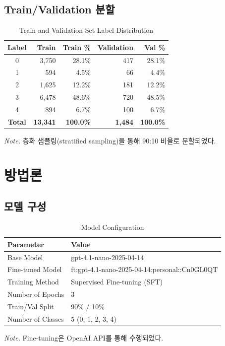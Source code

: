 \documentclass[11pt, a4paper]{article}
\begin{document}
\subsection{Train/Validation 분할}

\begin{table}[H]
\centering
\caption{Train and Validation Set Label Distribution}
\label{tab:train_val_split}
\begin{tabular}{crrrr}
\toprule
\textbf{Label} & \textbf{Train} & \textbf{Train \%} & \textbf{Validation} & \textbf{Val \%} \\
\midrule
0 & 3,750 & 28.1\% & 417 & 28.1\% \\
1 & 594 & 4.5\% & 66 & 4.4\% \\
2 & 1,625 & 12.2\% & 181 & 12.2\% \\
3 & 6,478 & 48.6\% & 720 & 48.5\% \\
4 & 894 & 6.7\% & 100 & 6.7\% \\
\midrule
\textbf{Total} & \textbf{13,341} & \textbf{100.0\%} & \textbf{1,484} & \textbf{100.0\%} \\
\bottomrule
\end{tabular}

\vspace{0.5em}
\footnotesize\textit{Note.} 층화 샘플링(stratified sampling)을 통해 90:10 비율로 분할되었다.
\end{table}

\section{방법론}

\subsection{모델 구성}

\begin{table}[H]
\centering
\caption{Model Configuration}
\label{tab:model_config}
\begin{tabular}{ll}
\toprule
\textbf{Parameter} & \textbf{Value} \\
\midrule
Base Model & gpt-4.1-nano-2025-04-14 \\
Fine-tuned Model & ft:gpt-4.1-nano-2025-04-14:personal::Cn0GL0QT \\
Training Method & Supervised Fine-tuning (SFT) \\
Number of Epochs & 3 \\
Train/Val Split & 90\% / 10\% \\
Number of Classes & 5 (0, 1, 2, 3, 4) \\
\bottomrule
\end{tabular}

\vspace{0.5em}
\footnotesize\textit{Note.} Fine-tuning은 OpenAI API를 통해 수행되었다.
\end{table}
\end{document}

